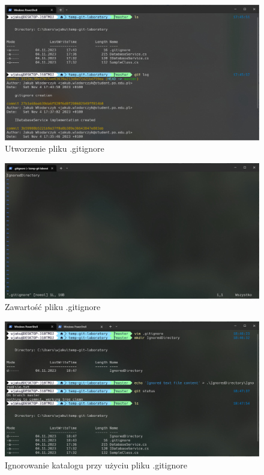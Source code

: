 \documentclass{article}
\begin{document}
\vspace*{\fill}
\begin{figure}[!h]
    \caption{Utworzenie pliku .gitignore}
    \centerline{\includegraphics [scale=0.5]{gitignore-creation.PNG}}
    \label{fig:label}
\end{figure}
\vspace*{\fill}
\newpage

\vspace*{\fill}
\begin{figure}[!h]
    \caption{Zawartość pliku .gitignore}
    \centerline{\includegraphics [scale=0.5]{gitignore.PNG}}
    \label{fig:label}
\end{figure}
\vspace*{\fill}
\newpage

\vspace*{\fill}
\begin{figure}[!h]
    \caption{Ignorowanie katalogu przy użyciu pliku .gitignore}
    \centerline{\includegraphics [scale=0.5]{gitignore-working.PNG}}
    \label{fig:label}
\end{figure}
\vspace*{\fill}
\newpage
\end{document}
